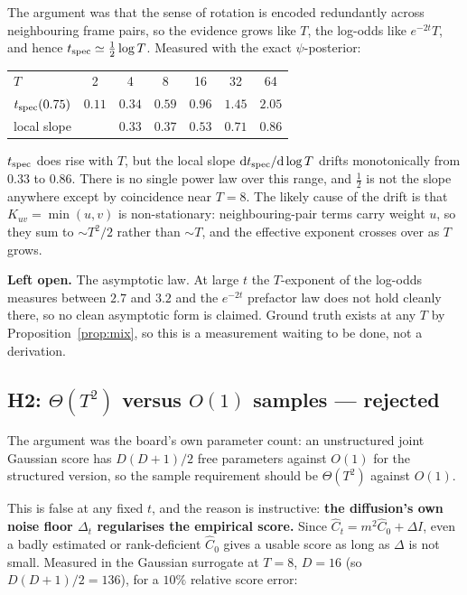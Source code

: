 \documentclass[11pt]{article}
\theoremstyle{plain}
\theoremstyle{remark}
\newcommand{\dd}{\mathrm{d}}
\begin{document}
The argument was that the sense of rotation is encoded redundantly across
neighbouring frame pairs, so the evidence grows like $T$, the log-odds like
$e^{-2t}T$, and hence $t_{\rm spec} \simeq \tfrac12\log T$. Measured with the
exact $\psi$-posterior:

\begin{center}\small
\begin{tabular}{lcccccc}
\toprule
$T$ & 2 & 4 & 8 & 16 & 32 & 64\\
$t_{\rm spec}(0.75)$ & $0.11$ & $0.34$ & $0.59$ & $0.96$ & $1.45$ & $2.05$\\
local slope & \multicolumn{1}{c}{} & $0.33$ & $0.37$ & $0.53$ & $0.71$ & $0.86$\\
\bottomrule
\end{tabular}
\end{center}

\noindent
$t_{\rm spec}$ does rise with $T$, but the local slope
$\dd t_{\rm spec}/\dd\log T$ drifts monotonically from $0.33$ to $0.86$. There
is no single power law over this range, and $\tfrac12$ is not the slope anywhere
except by coincidence near $T = 8$. The likely cause of the drift is that
$K_{uv} = \min(u,v)$ is non-stationary: neighbouring-pair terms carry weight
$u$, so they sum to $\sim T^2/2$ rather than $\sim T$, and the effective
exponent crosses over as $T$ grows.

\textbf{Left open.} The asymptotic law. At large $t$ the $T$-exponent of the
log-odds measures between $2.7$ and $3.2$ and the $e^{-2t}$ prefactor law does
not hold cleanly there, so no clean asymptotic form is claimed. Ground truth
exists at any $T$ by Proposition~\ref{prop:mix}, so this is a measurement
waiting to be done, not a derivation.

\subsection{H2: \texorpdfstring{$\Theta(T^2)$}{Theta(T2)} versus \texorpdfstring{$O(1)$}{O(1)} samples --- rejected}

The argument was the board's own parameter count: an unstructured joint
Gaussian score has $D(D+1)/2$ free parameters against $O(1)$ for the structured
version, so the sample requirement should be $\Theta(T^2)$ against $O(1)$.

This is false at any fixed $t$, and the reason is instructive: \textbf{the
diffusion's own noise floor $\Delta_t$ regularises the empirical score.} Since
$\hat C_t = m^2 \hat C_0 + \Delta I$, even a badly estimated or rank-deficient
$\hat C_0$ gives a usable score as long as $\Delta$ is not small. Measured in
the Gaussian surrogate at $T = 8$, $D = 16$ (so $D(D+1)/2 = 136$), for a $10\%$
relative score error:
\end{document}
